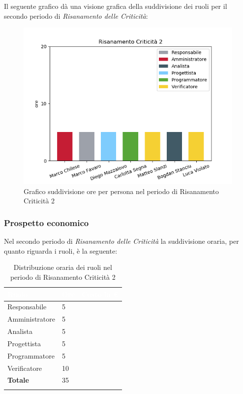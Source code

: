 Il seguente grafico dà una visione grafica della suddivisione dei ruoli per il secondo periodo di \textit{Risanamento delle Criticità}:\begin{figure}[H]
	\centering
  		\includegraphics[width=1\linewidth]{./images/fig_rc2.png}
  		\caption{Grafico suddivisione ore per persona nel periodo di Risanamento Criticità 2}
  		\label{fig:grafico suddivione ruoli rc2}
\end{figure}



\subsubsection{Prospetto economico}
Nel secondo periodo di \textit{Risanamento delle Criticità} la suddivisione oraria, per quanto riguarda i ruoli, è la seguente: 


\begin{longtable}{| C{.30\textwidth}| C{.15\textwidth}| C{.20\textwidth}|}
\hline
{}\textbf{\textcolor{white}{Ruolo}} & \textbf{\textcolor{white}{Ore}} & \textbf{\textcolor{white}{Costo in \euro}} \\
\hline 
Responsabile & 5 &  \\
\hline
{}Amministratore & 5 &  \\
\hline
Analista & 5 &  \\
\hline
{}Progettista & 5 & \\
\hline
Programmatore & 5 &  \\
\hline 
{}Verificatore & 10 &  \\
\hline
\textbf{Totale} & 35 &  \\
\hline 

\caption{Distribuzione oraria dei ruoli nel periodo di Risanamento Criticità 2}
\label{Distribuzione oraria rc2}
\end{longtable}

